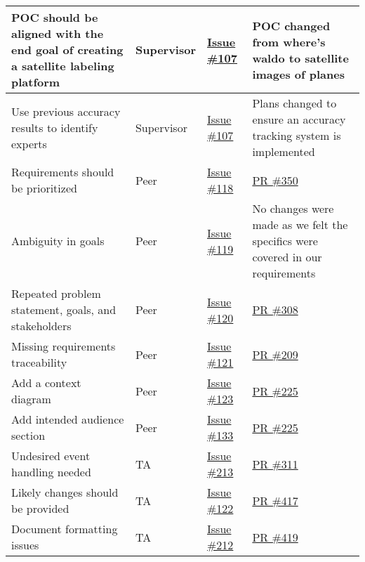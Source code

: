 \documentclass{article}
\begin{document}
\begin{longtable}{|p{5cm}|p{1.5cm}|p{2cm}|p{5cm}|}
%
POC should be aligned with the end goal of creating a satellite labeling platform & Supervisor & \href{https://github.com/OKKM-insights/OKKM.insights/issues/107}{Issue \#107} & POC changed from where's waldo to satellite images of planes \\ \hline
Use previous accuracy results to identify experts & Supervisor & \href{https://github.com/OKKM-insights/OKKM.insights/issues/107}{Issue \#107} & Plans changed to ensure an accuracy tracking system is implemented \\ \hline
Requirements should be prioritized & Peer & \href{https://github.com/OKKM-insights/OKKM.insights/issues/118}{Issue \#118} & \href{https://github.com/OKKM-insights/OKKM.insights/pull/350}{PR \#350} \\ \hline
Ambiguity in goals & Peer & \href{https://github.com/OKKM-insights/OKKM.insights/issues/119}{Issue \#119} & No changes were made as we felt the specifics were covered in our requirements \\ \hline
Repeated problem statement, goals, and stakeholders & Peer & \href{https://github.com/OKKM-insights/OKKM.insights/issues/120}{Issue \#120} & \href{https://github.com/OKKM-insights/OKKM.insights/pull/308}{PR \#308} \\ \hline
Missing requirements traceability & Peer &  \href{https://github.com/OKKM-insights/OKKM.insights/issues/121}{Issue \#121} & \href{https://github.com/OKKM-insights/OKKM.insights/pull/209}{PR \#209} \\ \hline
Add a context diagram & Peer & \href{https://github.com/OKKM-insights/OKKM.insights/issues/123}{Issue \#123} & \href{https://github.com/OKKM-insights/OKKM.insights/pull/225}{PR \#225} \\ \hline
Add intended audience section & Peer & \href{https://github.com/OKKM-insights/OKKM.insights/issues/133}{Issue \#133} & \href{https://github.com/OKKM-insights/OKKM.insights/pull/225}{PR \#225} \\ \hline
Undesired event handling needed & TA & \href{https://github.com/OKKM-insights/OKKM.insights/issues/213}{Issue \#213} & \href{https://github.com/OKKM-insights/OKKM.insights/pull/311}{PR \#311} \\ \hline
Likely changes should be provided & TA & \href{https://github.com/OKKM-insights/OKKM.insights/issues/122}{Issue \#122} & \href{https://github.com/OKKM-insights/OKKM.insights/pull/417}{PR \#417} \\ \hline
Document formatting issues & TA & \href{https://github.com/OKKM-insights/OKKM.insights/issues/212}{Issue \#212} & \href{https://github.com/OKKM-insights/OKKM.insights/pull/419}{PR \#419} \\ \hline

\end{longtable}
\end{document}
